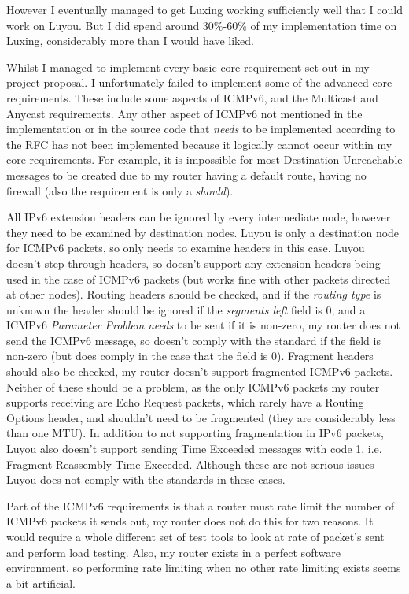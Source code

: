 \documentclass[12pt,a4paper,twoside,openright]{report}
\begin{document}
However I eventually managed to get Luxing working sufficiently well that I could work on Luyou. But I did spend around 30\%-60\% of my implementation time on Luxing, considerably more than I would have liked.

\bigskip

Whilst I managed to implement every basic core requirement set out in my project proposal. I unfortunately failed to implement some of the advanced core requirements. These include some aspects of ICMPv6, and the Multicast and Anycast requirements. Any other aspect of ICMPv6 not mentioned in the implementation or in the source code that \textit{needs} to be implemented according to the RFC has not been implemented because it logically cannot occur within my core requirements.  For example, it is impossible for most Destination Unreachable messages to be created due to my router having a default route, having no firewall (also the requirement is only a \textit{should}).

\bigskip

All IPv6 extension headers can be ignored by every intermediate node, however they need to be examined by destination nodes.  Luyou is only a destination node for ICMPv6  packets, so only needs to examine headers in this case. Luyou doesn't step through headers, so doesn't support any extension headers being used in the case of ICMPv6 packets (but works fine with other packets directed at other nodes). Routing headers should be checked, and if the \textit{routing type} is unknown the header should be ignored if the \textit{segments left} field is 0, and a ICMPv6 \textit{Parameter Problem} \textit{needs} to be sent if it is non-zero, my router does not send the ICMPv6 message, so doesn't comply with the standard if the field is non-zero (but does comply in the case that the field is 0). Fragment headers should also be checked, my router doesn't support fragmented ICMPv6 packets.  Neither of these should be a problem, as the only ICMPv6 packets my router supports receiving are Echo Request packets, which rarely have a Routing Options header, and shouldn't need to be fragmented (they are considerably less than one MTU). In addition to not supporting fragmentation in IPv6 packets, Luyou also doesn't support sending Time Exceeded messages with code 1, i.e. Fragment Reassembly Time Exceeded. Although these are not serious issues Luyou does not comply with the standards in these cases.

\bigskip

Part of the ICMPv6 requirements is that a router must rate limit the number of ICMPv6 packets it sends out, my router does not do this for two reasons.  It would require a whole different set of test tools to look at rate of packet's sent and perform load testing.  Also, my router exists in a perfect software environment, so performing rate limiting when no other rate limiting exists seems a bit artificial.
\end{document}
